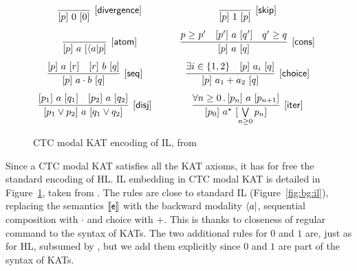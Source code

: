 \begin{figure}[t]
	\centering
	\begin{framed}
		\(
		\begin{array}{cc}
			\infer[\ilrule{divergence}]
			{\iltriple{p}{0}{0}}
			{}
			\quad                     &
			\infer[\ilrule{skip}]
			{\iltriple{p}{1}{p}}
			{}
			\\[7.5pt]
			\infer[\ilrule{atom}]
			{\iltriple{p}{a}{\bdiamond{a}p}}
			{}
			\quad                     &
			\infer[\ilrule{cons}]
			{\iltriple{p}{a}{q}}
			{p \geq p'                & \iltriple{p'}{a}{q'}     & q' \geq q}
			\\[7.5pt]
			\infer[\ilrule{seq}]
			{\iltriple{p}{a \cdot b}{q}}
			{\iltriple{p}{a}{r}       & \iltriple{r}{b}{q}}
			\qquad                    &
			\infer[\ilrule{choice}]
			{\iltriple{p}{a_1 + a_2}{q}}
			{\exists i \in \{ 1, 2 \} & \iltriple{p}{a_i}{q}}
			\\[7.5pt]
			\infer[\ilrule{disj}]
			{\iltriple{p_1 \lor p_2}{a}{q_1 \lor q_2}}
			{\iltriple{p_1}{a}{q_1}   & \iltriple{p_2}{a}{q_2} }
			\qquad                    &
			\infer[\ilrule{iter}]
			{\iltriple{p_0}{a^\kstar}{\bigvee\limits_{n \ge 0} p_n}}
			{\forall n \ge 0 \sdot \iltriple{p_n}{a}{p_{n+1}}}
		\end{array}
		\)
	\end{framed}
	\vspace{-1ex}
	\caption{CTC modal KAT encoding of IL, from \cite{MOH21}}\label{fig:sota:il-kat}
\end{figure}

Since a CTC modal KAT satisfies all the KAT axioms, it has for free the standard encoding of HL.
IL embedding in CTC modal KAT is detailed in Figure~\ref{fig:sota:il-kat}, taken from \cite{MOH21}. The rules are close to standard IL (Figure~\ref{fig:bg:il}), replacing the semantics $\llbracket\mathsf{e}\rrbracket$ with the backward modality $\langle a \vert$, sequential composition with $\cdot$ and choice with $+$. This is thanks to closeness of regular command to the syntax of KATs. The two additional rules for $0$ and $1$ are, just as for HL, subsumed by , but we add them explicitly since $0$ and $1$ are part of the syntax of KATs.

